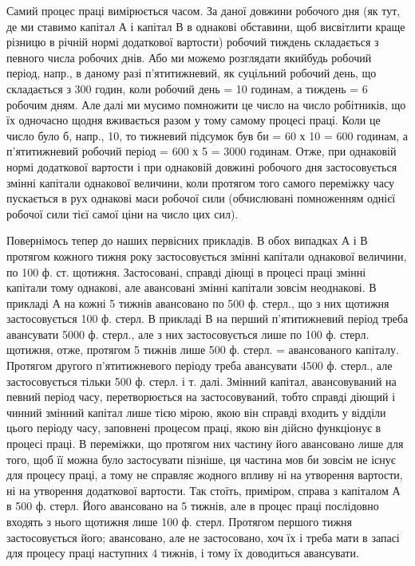 Самий процес праці вимірюється часом. За даної довжини робочого
дня (як тут, де ми ставимо капітал А і капітал В в однакові обставини,
щоб висвітлити краще різницю в річній нормі додаткової вартости)
робочий тиждень складається з певного числа робочих днів. Або ми
можемо розглядати якийбудь робочий період, напр., в даному разі п’ятитижневий,
як суцільний робочий день, що складається з 300 годин, коли
робочий день = 10 годинам, а тиждень = 6 робочим дням. Але далі ми
мусимо помножити це число на число робітників, що їх одночасно щодня
вживається разом у тому самому процесі праці. Коли це число
було б, напр., 10, то тижневий підсумок був би = 60 х 10 = 600 годинам,
а п’ятитижневий робочий період = 600 х 5 = 3000 годинам. Отже,
при однаковій нормі додаткової вартости і при однаковій довжині робочого
дня застосовується змінні капітали однакової величини, коли протягом
того самого переміжку часу пускається в рух однакові маси робочої
сили (обчислювані помноженням однієї робочої сили тієї самої
ціни на число цих сил).

Повернімось тепер до наших первісних прикладів. В обох випадках
А і В протягом кожного тижня року застосовується змінні капітали
однакової величини, по 100 ф. ст. щотижня. Застосовані, справді діющі
в процесі праці змінні капітали тому однакові, але авансовані змінні
капітали зовсім неоднакові. В прикладі А на кожні 5 тижнів авансовано по
500 ф. стерл., що з них щотижня застосовується 100 ф. стерл. В прикладі
В на перший п’ятитижневий період треба авансувати 5000 ф. стерл., але
з них застосовується лише по 100 ф. стерл. щотижня, отже, протягом
5 тижнів лише 500 ф. стерл. =  авансованого капіталу. Протягом
другого п’ятитижневого періоду треба авансувати 4500 ф. стерл., але застосовується
тільки 500 ф. стерл. і т. далі. Змінний капітал, авансовуваний
на певний період часу, перетворюється на застосовуваний, тобто справді
діющий і чинний змінний капітал лише тією мірою, якою він справді входить
у відділи цього періоду часу, заповнені процесом праці, якою він
дійсно функціонує в процесі праці. В переміжки, що протягом них
частину його авансовано лише для того, щоб її можна було застосувати
пізніше, ця частина мов би зовсім не існує для процесу праці, а тому
не справляє жодного впливу ні на утворення вартости, ні на утворення
додаткової вартости. Так стоїть, приміром, справа з капіталом А в
500 ф. стерл. Його авансовано на 5 тижнів, але в процес праці послідовно
входять з нього щотижня лише 100 ф. стерл. Протягом першого тижня
застосовується  його;  авансовано, але не застосовано, хоч їх і
треба мати в запасі для процесу праці наступних 4 тижнів, і тому їх
доводиться авансувати.

